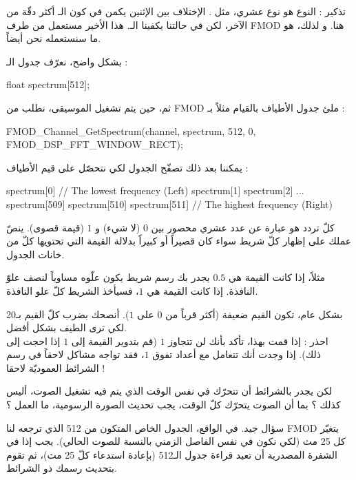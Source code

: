 \begin{information}
تذكير : النوع
هو نوع عشري، مثل
.
الإختلاف بين الإثنين يكمن في كون الـ
أكثر دقّة من الآخر، لكن في حالتنا يكفينا الـ.
هذا الأخير مستعمل من طرف
\textenglish{FMOD}
هنا. و لذلك، هو ما سنستعمله نحن أيضاً.
\end{information}

بشكل واضح، نعرّف جدول الـ :

\begin{Csource}
float spectrum[512];
\end{Csource}

ثم، حين يتم تشغيل الموسيقى، نطلب من 
\textenglish{FMOD}
ملئ جدول الأطياف بالقيام مثلاً بـ :

\begin{Csource}
FMOD_Channel_GetSpectrum(channel, spectrum, 512, 0, FMOD_DSP_FFT_WINDOW_RECT);
\end{Csource}

يمكننا بعد ذلك تصفّح الجدول لكي نتحصّل على قيم الأطياف :

\begin{Csource}
spectrum[0] // The lowest frequency (Left)
spectrum[1]
spectrum[2]
...
spectrum[509]
spectrum[510]
spectrum[511] // The highest frequency (Right)
\end{Csource}

كلّ تردد هو عبارة عن عدد عشري محصور بين $ 0 $ (لا شيء) و $ 1 $ (قيمة قصوى). ينصّ عملك على إظهار كلّ شريط سواء كان قصيراً أو كبيراً بدلالة القيمة التي تحتويها كلّ من خانات الجدول.

مثلاً، إذا كانت القيمة هي $ 0.5 $ يجدر بك رسم شريط يكون علّوه مساوياً لنصف علوّ النافذة. إذا كانت القيمة هي $ 1 $، فسيأخذ الشريط كلّ علو النافذة.

بشكل عام، تكون القيم ضعيفة (أكثر قرباً من $ 0 $ على $ 1 $). أنصحك بضرب كلّ القيم بـ20 لكي ترى الطيف بشكل أفضل.\\
احذر : إذا قمت بهذا، تأكد بأنك لن تتجاوز $ 1 $ (قم بتدوير القيمة إلى $ 1 $ إذا احجت إلى ذلك). إذا وجدت أنك تتعامل مع أعداد تفوق $ 1 $، فقد تواجه مشاكل لاحقاً في رسم الشرائط العموديّة لاحقا !

\begin{question}
لكن يجدر بالشرائط أن تتحرّك في نفس الوقت الذي يتم فيه تشغيل الصوت، أليس كذلك ؟ بما أن الصوت يتحرّك كلّ الوقت، يجب تحديث الصورة الرسومية، ما العمل ؟
\end{question}

سؤال جيد. في الواقع، الجدول الخاص المتكون من 
512 
الذي ترجعه لنا
\textenglish{FMOD}
يتغيّر كل 25 مث (لكي نكون في نفس الفاصل الزمني بالنسبة للصوت الحالي). يجب إذا في الشفرة المصدرية أن تعيد قراءة جدول الـ512
 (بإعادة استدعاء
 كلّ 25 مث)، ثم تقوم بتحديث رسمك ذو الشرائط.
 
